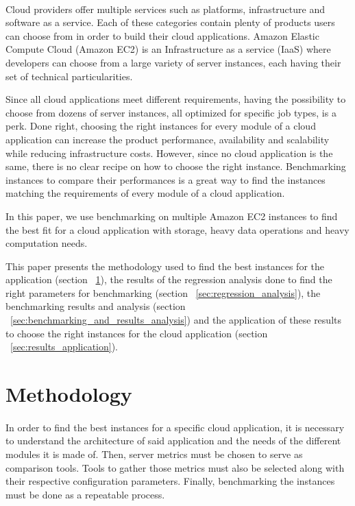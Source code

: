\documentclass[11pt]{article}
\begin{document}
	\paragraph{} Cloud providers offer multiple services such as platforms,
	infrastructure and software as a service. Each of these categories contain
	plenty of products users can choose from in order to build their cloud
	applications. Amazon Elastic Compute Cloud (Amazon EC2) is an Infrastructure
	as a service (IaaS) where developers can choose from a large variety of
	server instances, each having their set of technical particularities.
	\cite{1}\bigskip

	Since all cloud applications meet different requirements, having the
	possibility to choose from dozens of server instances, all optimized for
	specific job types, is a perk. Done right, choosing the right instances for
	every module of a cloud application can increase the product performance,
	availability and scalability while reducing infrastructure costs. However,
	since no cloud application is the same, there is no clear recipe on how to
	choose the right instance. Benchmarking instances to compare their
	performances is a great way to find the instances matching the requirements
	of every module of a cloud application.
	\bigskip

	In this paper, we use benchmarking on multiple Amazon EC2 instances to find
	the best fit for a cloud application with storage, heavy data operations and
	heavy computation needs.
	\bigskip

	This paper presents the methodology used to find the best instances for the
	application (section ~\ref{sec:methodology}), the results of the regression analysis done to find
	the right parameters for benchmarking (section ~\ref{sec:regression_analysis}), the benchmarking results
	and analysis (section ~\ref{sec:benchmarking_and_results_analysis}) and the application of these results to choose the
	right instances for the cloud application (section ~\ref{sec:results_application}).
	\pagebreak

\section{Methodology} \label{sec:methodology}
	\paragraph{} In order to find the best instances for a specific cloud
	application, it is necessary to understand the architecture of said
	application and the needs of the different modules it is made of. Then,
	server metrics must be chosen to serve as comparison tools. Tools to gather
	those metrics must also be selected along with their respective
	configuration parameters. Finally, benchmarking the instances must be done
	as a repeatable process.
\end{document}
